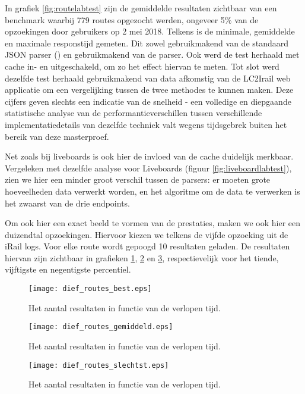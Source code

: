 In grafiek \ref{fig:routelabtest} zijn de gemiddelde resultaten zichtbaar van een benchmark waarbij 779 routes opgezocht werden, ongeveer 5\% van de opzoekingen door gebruikers op 2 mei 2018. Telkens is de minimale, gemiddelde en maximale responstijd gemeten. Dit zowel gebruikmakend van de standaard JSON parser () en gebruikmakend van de  parser. Ook werd de test herhaald met cache in- en uitgeschakeld, om zo het effect hiervan te meten. Tot slot werd dezelfde test herhaald gebruikmakend van data afkomstig van de LC2Irail web applicatie om een vergelijking tussen de twee methodes te kunnen maken. Deze cijfers geven slechts een indicatie van de snelheid - een volledige en diepgaande statistische analyse van de performantieverschillen tussen verschillende implementatiedetails van dezelfde techniek valt wegens tijdsgebrek buiten het bereik van deze masterproef.

Net zoals bij liveboards is ook hier de invloed van de cache duidelijk merkbaar. Vergeleken met dezelfde analyse voor Liveboards (figuur \ref{fig:liveboardlabtest}), zien we hier een minder groot verschil tussen de parsers: er moeten grote hoeveelheden data verwerkt worden, en het algoritme om de data te verwerken is het zwaarst van de drie endpoints.

Om ook hier een exact beeld te vormen van de prestaties, maken we ook hier een duizendtal opzoekingen. Hiervoor kiezen we telkens de vijfde opzoeking uit de iRail logs. Voor elke route wordt gepoogd 10 resultaten geladen. De resultaten hiervan zijn zichtbaar in grafieken \ref{fig:routesDiefBest}, \ref{fig:routesDiefAvg} en \ref{fig:routesDiefSlechtst}, respectievelijk voor het tiende, vijftigste en negentigste percentiel.

\begin{figure}[h]
	\centering
	\texttt{[image: dief\_routes\_best.eps]}
	\caption[Aantal resultaten routes in functie van de tijd]{Het aantal resultaten in functie van de verlopen tijd.}
	\label{fig:routesDiefBest}
\end{figure}

\begin{figure}[h]
	\centering
	\texttt{[image: dief\_routes\_gemiddeld.eps]}
	\caption[Aantal resultaten routes in functie van de tijd]{Het aantal resultaten in functie van de verlopen tijd.}
	\label{fig:routesDiefAvg}
\end{figure}

\begin{figure}[h]
	\centering
	\texttt{[image: dief\_routes\_slechtst.eps]}
	\caption[Aantal resultaten routes in functie van de tijd]{Het aantal resultaten in functie van de verlopen tijd.}
	\label{fig:routesDiefSlechtst}
\end{figure}

